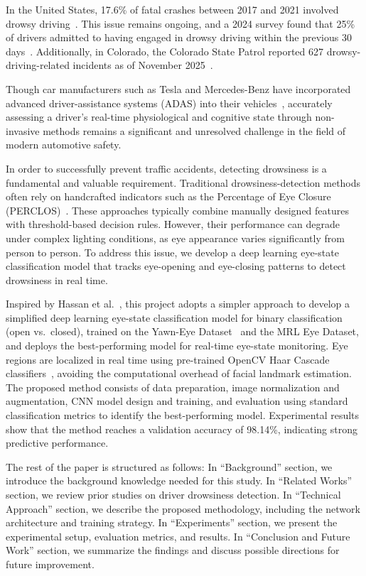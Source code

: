\documentclass[10pt,twocolumn,letterpaper]{article}
\begin{document}
In the United States, 17.6\% of fatal crashes between 2017 and 2021 involved drowsy driving~\cite{tefft2024drowsy}. 
This issue remains ongoing, and a 2024 survey found that 25\% of drivers admitted to having engaged in drowsy driving within the previous 30 days~\cite{AAA2024TSCI}.
Additionally, in Colorado, the Colorado State Patrol reported 627 drowsy-driving-related incidents as of November 2025~\cite{patla2025drowsy}.

Though car manufacturers such as Tesla and Mercedes-Benz have incorporated advanced driver-assistance systems (ADAS) into their vehicles~\cite{abd2023efficient,jabbar2020driver},
accurately assessing a driver's real-time physiological and cognitive state through non-invasive methods remains a significant and unresolved challenge in the field of modern automotive safety.

In order to successfully prevent traffic accidents, detecting drowsiness is a fundamental and valuable requirement. 
Traditional drowsiness-detection methods often rely on handcrafted indicators such as the Percentage of Eye Closure (PERCLOS)~\cite{dinges1998perclos}. 
These approaches typically combine manually designed features with threshold-based decision rules. 
However, their performance can degrade under complex lighting conditions, as eye appearance varies significantly from person to person. 
To address this issue, we develop a deep learning eye-state classification model that tracks eye-opening and eye-closing patterns to detect drowsiness in real time. 

Inspired by Hassan et al.~\cite{Hassan2025}, this project adopts a simpler approach to develop a simplified deep learning eye-state classification model for binary classification (open vs.\ closed), trained on the Yawn-Eye Dataset~\cite{raju_2020} and the MRL Eye Dataset, and deploys the best-performing model for real-time eye-state monitoring.
Eye regions are localized in real time using pre-trained OpenCV Haar Cascade classifiers~\cite{opencv_haarcascades}, avoiding the computational overhead of facial landmark estimation.
The proposed method consists of data preparation, image normalization and augmentation, CNN model design and training, and evaluation using standard classification metrics to identify the best-performing model.
Experimental results show that the method reaches a validation accuracy of 98.14\%, indicating strong predictive performance.

The rest of the paper is structured as follows: In ``Background'' section, we introduce the background knowledge needed for this study. 
In ``Related Works'' section, we review prior studies on driver drowsiness detection. 
In ``Technical Approach'' section, we describe the proposed methodology, including the network architecture and training strategy. 
In ``Experiments'' section, we present the experimental setup, evaluation metrics, and results. 
In ``Conclusion and Future Work'' section, we summarize the findings and discuss possible directions for future improvement.
\end{document}
